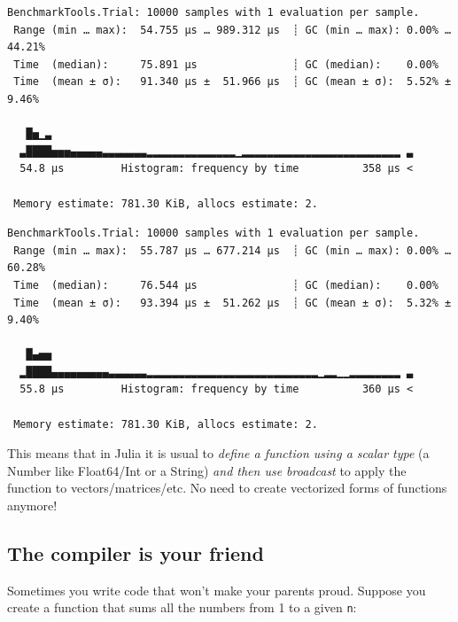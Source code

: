 \documentclass[
  letterpaper,
  DIV=11,
  numbers=noendperiod]{scrartcl}
\newenvironment{Shaded}{\begin{snugshade}}{\end{snugshade}}
\newcommand{\CommentTok}[1]{\textcolor[rgb]{0.37,0.37,0.37}{#1}}
\newcommand{\FunctionTok}[1]{\textcolor[rgb]{0.28,0.35,0.67}{#1}}
\newcommand{\NormalTok}[1]{\textcolor[rgb]{0.00,0.23,0.31}{#1}}
\newcommand{\OperatorTok}[1]{\textcolor[rgb]{0.37,0.37,0.37}{#1}}
\newcommand{\PreprocessorTok}[1]{\textcolor[rgb]{0.68,0.00,0.00}{#1}}
\begin{document}
\begin{verbatim}
BenchmarkTools.Trial: 10000 samples with 1 evaluation per sample.
 Range (min … max):  54.755 μs … 989.312 μs  ┊ GC (min … max): 0.00% … 44.21%
 Time  (median):     75.891 μs               ┊ GC (median):    0.00%
 Time  (mean ± σ):   91.340 μs ±  51.966 μs  ┊ GC (mean ± σ):  5.52% ±  9.46%

   █▅▁▃                                                         
  ▃████▅▅▅▄▄▄▄▄▃▃▃▃▃▃▃▂▂▂▂▂▂▂▂▂▂▂▂▂▂▁▂▂▂▂▂▂▂▂▂▂▂▂▂▂▂▂▂▂▂▂▂▂▂▂▂ ▃
  54.8 μs         Histogram: frequency by time          358 μs <

 Memory estimate: 781.30 KiB, allocs estimate: 2.
\end{verbatim}

\begin{Shaded}
\end{Shaded}

\begin{verbatim}
BenchmarkTools.Trial: 10000 samples with 1 evaluation per sample.
 Range (min … max):  55.787 μs … 677.214 μs  ┊ GC (min … max): 0.00% … 60.28%
 Time  (median):     76.544 μs               ┊ GC (median):    0.00%
 Time  (mean ± σ):   93.394 μs ±  51.262 μs  ┊ GC (mean ± σ):  5.32% ±  9.40%

   █▄▅▅                                                         
  ▂████▄▄▄▄▄▄▄▄▄▃▃▃▃▃▃▂▂▂▂▂▂▂▂▂▂▂▂▂▂▂▂▂▂▂▂▂▂▂▂▂▂▂▁▂▂▁▁▂▂▂▂▂▂▂▂ ▃
  55.8 μs         Histogram: frequency by time          360 μs <

 Memory estimate: 781.30 KiB, allocs estimate: 2.
\end{verbatim}

This means that in Julia it is usual to \emph{define a function using a
scalar type} (a Number like Float64/Int or a String) \emph{and then use
broadcast} to apply the function to vectors/matrices/etc. No need to
create vectorized forms of functions anymore!

\subsection{The compiler is your
friend}\label{the-compiler-is-your-friend}

Sometimes you write code that won't make your parents proud. Suppose you
create a function that sums all the numbers from 1 to a given
\texttt{n}:
\end{document}
